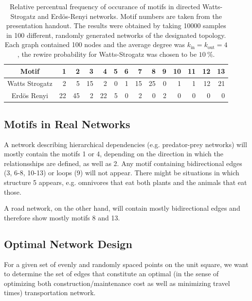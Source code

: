 \documentclass{scrartcl}
\begin{document}
\begin{table}
	\centering
		\begin{tabular}{c|*{13}{r}}
		\toprule
		Motif & \num{1} & 2 & 3 & 4 & 5 &6 & 7 & 8 & 9 & 10 &11 & 12& 13  \\ \midrule
		Watts Strogatz & \num{2} & \num{5} & \num{15} & \num{2} & \num{0} & \num{1} & \num{15} & \num{25} & \num{0} & \num{1} & \num{1} & \num{12} & \num{21} \\
		Erdös Renyi & \num{22} & \num{45} & \num{2} & \num{22} & \num{5} & \num{0} & \num{2} & \num{0} & \num{2} & \num{0} & \num{0} & \num{0} & \num{0}\\
		\bottomrule
		\end{tabular}
	\caption{Relative percentual frequency of occurance of motifs in directed Watts-Strogatz and Erdös-Renyi networks. Motif numbers are taken from the presentation handout. The results were obtained by taking 10000 samples in 100 different, randomly generated networks of the designated topology. Each graph contained 100 nodes and the average degree was $k_{\mathrm{in}} = k_{\mathrm{out}}=4$, the rewire probability for Watts-Strogatz was chosen to be $\SI{10}{\percent}$.}
	\label{tab:motifs}
\end{table}

\subsection{Motifs in Real Networks}
A network describing hierarchical dependencies (e.g. predator-prey networks) will mostly contain the motifs 1 or 4, depending on the direction in which the relationsships are defined, as well as 2. Any motif containing bidirectional edges (3, 6-8, 10-13) or loops (9) will not appear. There might be situations in which structure 5 appears, e.g. omnivores that eat both plants and the animals that eat those.

A road network, on the other hand, will contain mostly bidirectional edges and therefore show mostly motifs 8 and 13. 

\subsection{Optimal Network Design}
For a given set of evenly and randomly spaced points on the unit square, we
want to determine the set of edges that constitute an optimal (in the sense
of optimizing both construction/maintenance cost as well as minimizing
travel times) transportation network.
\end{document}
